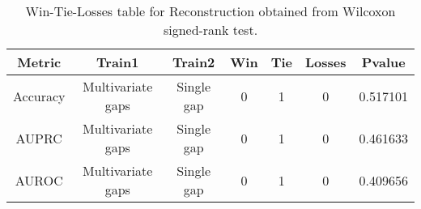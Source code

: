 \begin{table}[H]
\centering
\begin{tabular}{|c|c|c|c|c|c|c|}

\textbf{Metric} &    \textbf{Train1} & \textbf{Train2} &  \textbf{Win} &  \textbf{Tie} &  \textbf{Losses} &  \textbf{Pvalue} \\
\hline

       Accuracy &  Multivariate gaps &      Single gap &             0 &             1 &                0 &         0.517101 \\
\hline
          AUPRC &  Multivariate gaps &      Single gap &             0 &             1 &                0 &         0.461633 \\
\hline
          AUROC &  Multivariate gaps &      Single gap &             0 &             1 &                0 &         0.409656 \\
\hline

\end{tabular}
\caption{Win-Tie-Losses table for Reconstruction obtained from Wilcoxon signed-rank test.}
\label{tab:reconstruction_training_data_comparison}
\end{table}